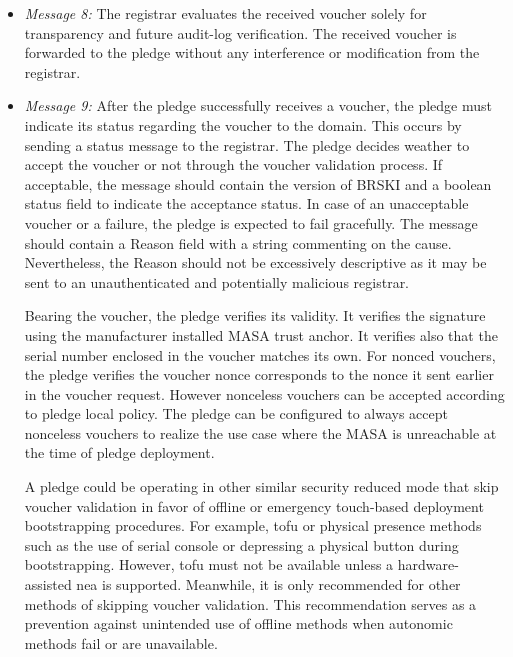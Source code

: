 \begin{itemize}
	\item \textit{Message 8:} The registrar evaluates the received voucher solely for transparency and future audit-log verification. The received voucher is forwarded to the pledge without any interference or modification from the registrar.

	\item \textit{Message 9:}
 	 After the pledge successfully receives a voucher, the pledge must indicate its status regarding the voucher to the domain. This occurs by sending a status message to the registrar. The pledge decides weather to accept the voucher or not through the voucher validation process. If acceptable, the message should contain the version of BRSKI and a boolean status field to indicate the acceptance status. In case of an unacceptable voucher or a failure, the pledge is expected to fail gracefully. The message should contain a Reason field with a string commenting on the cause. Nevertheless, the Reason should not be excessively descriptive as it may be sent to an unauthenticated and potentially malicious registrar.
	 \par
	 Bearing the voucher, the pledge verifies its validity. It verifies the signature using the manufacturer installed MASA trust anchor. It verifies also that the serial number enclosed in the voucher matches its own. For nonced vouchers, the pledge verifies the voucher nonce corresponds to the nonce it sent earlier in the voucher request. However nonceless vouchers can be accepted according to pledge local policy. The pledge can be configured to always accept nonceless vouchers to realize the use case where the MASA is unreachable at the time of pledge deployment.
	 \par
 	 A pledge could be operating in other similar security reduced mode that skip voucher validation in favor of offline or emergency touch-based deployment bootstrapping procedures. For example, \gls{tofu} or physical presence methods such as the use of serial console or depressing a physical button during bootstrapping. However, \gls{tofu} must not be available unless a hardware-assisted \gls{nea} is supported. Meanwhile, it is only recommended for other methods of skipping voucher validation. This recommendation serves as a prevention against unintended use of offline methods when autonomic methods fail or are unavailable.
	 

\end{itemize}
